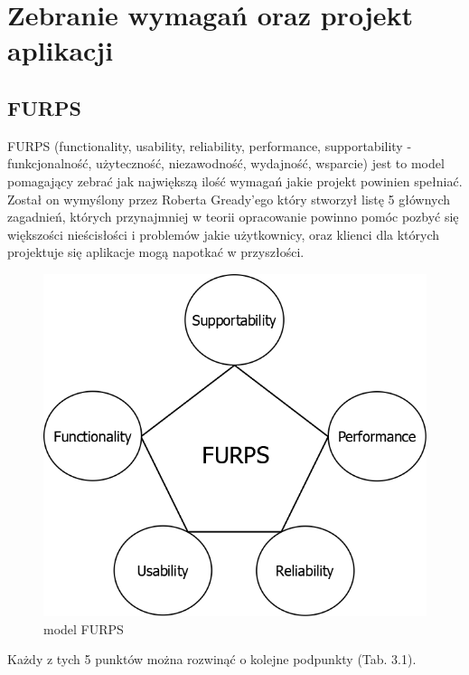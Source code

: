 \documentclass[a4paper,12pt, twoside]{book} %
\begin{document}
\chapter{Zebranie wymagań oraz projekt aplikacji}

\section{FURPS}
FURPS  (functionality, usability, reliability, performance, supportability - funkcjonalność, użyteczność, niezawodność, wydajność, wsparcie) \cite{furps} jest to model pomagający zebrać jak największą ilość wymagań jakie projekt powinien spełniać. Został on wymyślony przez Roberta Gready'ego który stworzył listę 5 głównych zagadnień, których przynajmniej w teorii opracowanie powinno pomóc pozbyć się większości nieścisłości i problemów jakie użytkownicy, oraz klienci dla których projektuje się aplikacje mogą napotkać w przyszłości.

\begin{figure}[h]
	\centering
	\includegraphics[scale=0.35]{Diagram2.png}
	\caption{model FURPS}
\end{figure}

Każdy z tych 5 punktów można rozwinąć o kolejne podpunkty (Tab. 3.1). 
\end{document}
